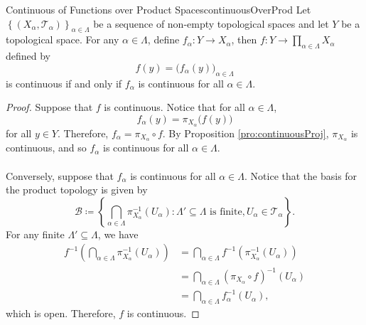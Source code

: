 \documentclass[math]{amznotes}
\theoremstyle{remark}
\begin{document}
\begin{probox}{Continuous of Functions over Product Spaces}{continuousOverProd}
    Let $\left\{\left(X_{\alpha}, \mathcal{T}_{\alpha}\right)\right\}_{\alpha \in \Lambda}$ be a sequence of non-empty topological spaces and let $Y$ be a topological space. For any $\alpha \in \Lambda$, define $f_{\alpha} \colon Y \to X_{\alpha}$, then $f \colon Y \to \prod_{\alpha \in \Lambda}X_{\alpha}$ defined by 
    \begin{equation*}
        f\left(y\right) = \bigl(f_{\alpha}\left(y\right)\bigr)_{\alpha \in \Lambda}
    \end{equation*}
    is continuous if and only if $f_{\alpha}$ is continuous for all $\alpha \in \Lambda$.
    \tcblower
    \begin{proof}
        Suppose that $f$ is continuous. Notice that for all $\alpha \in \Lambda$,
        \begin{equation*}
            f_{\alpha}\left(y\right) = \pi_{X_{\alpha}}\bigl(f\left(y\right)\bigr)
        \end{equation*}
        for all $y \in Y$. Therefore, $f_{\alpha} = \pi_{X_{\alpha}} \circ f$. By Proposition \ref{pro:continuousProj}, $\pi_{X_{\alpha}}$ is continuous, and so $f_{\alpha}$ is continuous for all $\alpha \in \Lambda$.
        \\\\
        Conversely, suppose that $f_{\alpha}$ is continuous for all $\alpha \in \Lambda$. Notice that the basis for the product topology is given by 
        \begin{equation*}
            \mathcal{B} \coloneqq \left\{\bigcap_{\alpha \in \Lambda}\pi^{-1}_{X_{\alpha}}\left(U_{\alpha}\right) \colon \Lambda' \subseteq \Lambda \textrm{ is finite}, U_{\alpha} \in \mathcal{T}_{\alpha}\right\}.
        \end{equation*}
        For any finite $\Lambda' \subseteq \Lambda$, we have 
        \begin{align*}
            f^{-1}\left(\bigcap_{\alpha \in \Lambda}\pi^{-1}_{X_{\alpha}}\left(U_{\alpha}\right)\right) & = \bigcap_{\alpha \in \Lambda}f^{-1}\left(\pi^{-1}_{X_{\alpha}}\left(U_{\alpha}\right)\right) \\
            & = \bigcap_{\alpha \in \Lambda}\left(\pi_{X_{\alpha}} \circ f\right)^{-1}\left(U_{\alpha}\right) \\
            & =  \bigcap_{\alpha \in \Lambda}f_{\alpha}^{-1}\left(U_{\alpha}\right),
        \end{align*}
        which is open. Therefore, $f$ is continuous.
    \end{proof}
\end{probox}
\end{document}
